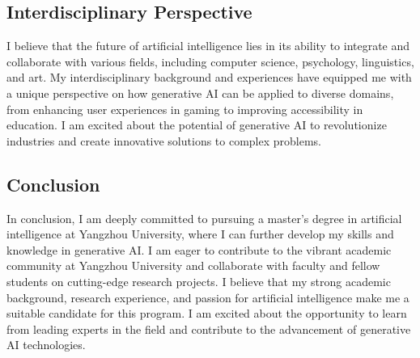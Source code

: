\documentclass[12pt,a4paper]{article}
\begin{document}
\begin{CJK*}{UTF8}{gbsn}
\subsection*{Interdisciplinary Perspective}
I believe that the future of artificial intelligence lies in its ability to integrate and collaborate with various fields, including computer science, psychology, linguistics, and art. My interdisciplinary background and experiences have equipped me with a unique perspective on how generative AI can be applied to diverse domains, from enhancing user experiences in gaming to improving accessibility in education. I am excited about the potential of generative AI to revolutionize industries and create innovative solutions to complex problems.

\subsection*{Conclusion}
In conclusion, I am deeply committed to pursuing a master's degree in artificial intelligence at Yangzhou University, where I can further develop my skills and knowledge in generative AI. I am eager to contribute to the vibrant academic community at Yangzhou University and collaborate with faculty and fellow students on cutting-edge research projects. I believe that my strong academic background, research experience, and passion for artificial intelligence make me a suitable candidate for this program. I am excited about the opportunity to learn from leading experts in the field and contribute to the advancement of generative AI technologies.






\end{CJK*}
\end{document}
